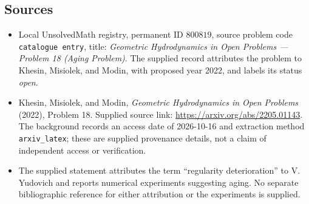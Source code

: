 \documentclass[11pt]{article}
\begin{document}
\subsection{Sources}
\begin{itemize}
\item Local UnsolvedMath registry, permanent ID \(800819\), source problem code \texttt{catalogue entry}, title: \emph{Geometric Hydrodynamics in Open Problems --- Problem 18 (Aging Problem)}. The supplied record attributes the problem to Khesin, Misiolek, and Modin, with proposed year 2022, and labels its status \emph{open}.
\item Khesin, Misiolek, and Modin, \emph{Geometric Hydrodynamics in Open Problems} (2022), Problem 18. Supplied source link: \url{https://arxiv.org/abs/2205.01143}. The background records an access date of 2026-10-16 and extraction method \texttt{arxiv\_latex}; these are supplied provenance details, not a claim of independent access or verification.
\item The supplied statement attributes the term ``regularity deterioration'' to V. Yudovich and reports numerical experiments suggesting aging. No separate bibliographic reference for either attribution or the experiments is supplied.
\end{itemize}
\end{document}
